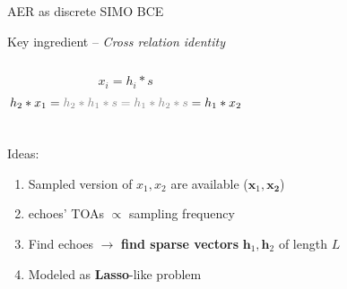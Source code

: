 \begin{frame}{AER as discrete SIMO BCE}

    \begin{block}{Key ingredient -- \textit{Cross relation identity}}
        \begin{columns}[onlytextwidth]
            \[
                x_i = h_i \ast s
            \]
            \[
                h_2 \ast x_1 = \textcolor{gray}{h_2 \ast h_1 \ast s  = h_1 \ast h_2 \ast s} = h_1 \ast x_2
            \]

        \end{columns}
    \end{block}

    \vspace*{-1em}

    \begin{block}{Ideas:}
    \begin{enumerate}
        \item Sampled version of $x_1,x_2$ are available ($\mathbf{x}_1, \mathbf{x_2}$)
        \item echoes' TOAs $\propto$ sampling frequency
        \item Find echoes $\rightarrow$ \textbf{find sparse vectors} $\mathbf{h}_1, \mathbf{h}_2$ of length $L$
        \item Modeled as \textbf{Lasso}-like problem


\end{enumerate}
\end{block}
\end{frame}
